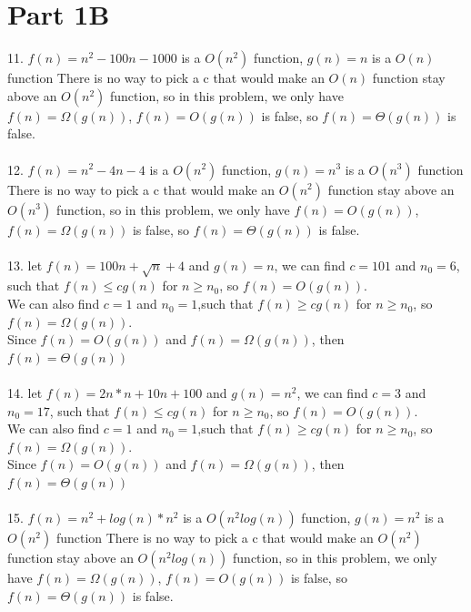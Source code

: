 \documentclass[12pt]{article}
\begin{document}
\section*{Part 1B}
11. $f(n) = n^2-100n-1000$ is a $O(n^2)$ function, $g(n) = n$ is a $O(n)$ function
There is no way to pick a c that would make an $O(n)$ function stay above an 
$O(n^2)$ function, so in this problem, we only have $f(n) = \Omega(g(n))$, $f(n) = O(g(n))$
is false, so $f(n) = \Theta(g(n))$ is false.\\
\\
12. $f(n) = n^2-4n-4$ is a $O(n^2)$ function, $g(n) = n^3$ is a $O(n^3)$ function
There is no way to pick a c that would make an $O(n^2)$ function stay above an 
$O(n^3)$ function, so in this problem, we only have $f(n) = O(g(n))$, $f(n) = \Omega(g(n))$
is false, so $f(n) = \Theta(g(n))$ is false.\\
\\
13. let $f(n) = 100n + \sqrt n + 4$ and $g(n) = n$, we can find $c = 101$ and $n_0 = 6$, such that $f(n) \leq cg(n)$ for $n \geq n_0$, so $f(n) = O(g(n))$. \\
We can also find $c = 1$ and $n_0 = 1$,such that $f(n) \geq cg(n)$ for $n \geq n_0$, so $f(n) = \Omega(g(n))$. 
\\Since $f(n) = O(g(n))$ and $f(n) = \Omega(g(n))$, then $f(n) = \Theta(g(n))$\\
\\
14. let $f(n) = 2n*n + 10n + 100$ and $g(n) = n^2$, we can find $c = 3$ and $n_0 = 17$, such that $f(n) \leq cg(n)$ for $n \geq n_0$, so $f(n) = O(g(n))$. \\
We can also find $c = 1$ and $n_0 = 1$,such that $f(n) \geq cg(n)$ for $n \geq n_0$, so $f(n) = \Omega(g(n))$. 
\\Since $f(n) = O(g(n))$ and $f(n) = \Omega(g(n))$, then $f(n) = \Theta(g(n))$\\
\\
15. $f(n) = n^2+log(n)*n^2$ is a $O(n^2log(n))$ function, $g(n) = n^2$ is a $O(n^2)$ function
There is no way to pick a c that would make an $O(n^2)$ function stay above an 
$O(n^2log(n))$ function, so in this problem, we only have $f(n) = \Omega(g(n))$, $f(n) = O(g(n))$
is false, so $f(n) = \Theta(g(n))$ is false.\\
\end{document}
